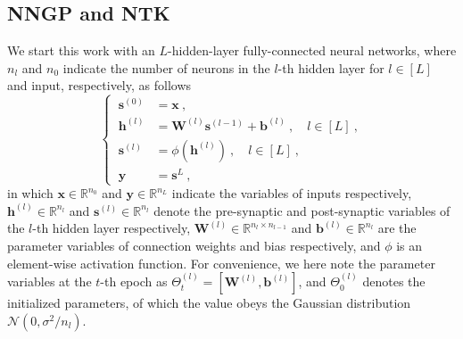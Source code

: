 \documentclass[review,10pt]{JMtemplate}
\begin{document}
\subsection{NNGP and NTK}  \label{subsec:two_kernels}
We start this work with an $L$-hidden-layer fully-connected neural networks, where $n_l$ and $n_0$ indicate the number of neurons in the $l$-th hidden layer for $l \in [L]$ and input, respectively, as follows
\begin{equation} \label{eq:feedforward}
	\left\{~\begin{aligned}
		\boldsymbol{s}^{(0)} &= \boldsymbol{x} \ , \\
		\boldsymbol{h}^{(l)} &= \mathbf{W}^{(l)} \boldsymbol{s}^{(l-1)} + \boldsymbol{b}^{(l)} \ ,\quad l \in [L] \ , \\
		\boldsymbol{s}^{(l)} &= \phi( \boldsymbol{h}^{(l)} ) \ ,\quad l \in [L] \ , \\
		\boldsymbol{y} &= \boldsymbol{s}^{L} \ ,
	\end{aligned}\right.
\end{equation}
in which $\boldsymbol{x} \in \mathbb{R}^{n_0}$ and $\boldsymbol{y} \in \mathbb{R}^{n_L}$ indicate the variables of inputs respectively, $\boldsymbol{h}^{(l)} \in \mathbb{R}^{n_l}$ and $\boldsymbol{s}^{(l)} \in \mathbb{R}^{n_l}$ denote the pre-synaptic and post-synaptic variables of the $l$-th hidden layer respectively,  $\mathbf{W}^{(l)} \in \mathbb{R}^{n_l \times n_{l-1}} $ and $\boldsymbol{b}^{(l)} \in \mathbb{R}^{n_l} $ are the parameter variables of connection weights and bias respectively, and $\phi$ is an element-wise activation function. For convenience, we here note the parameter variables at the $t$-th epoch as $\Theta^{(l)}_t = [ \mathbf{W}^{(l)}, \boldsymbol{b}^{(l)} ]$, and $\Theta^{(l)}_0$ denotes the initialized parameters, of which the value obeys the Gaussian distribution $\mathcal{N}(0, \sigma^2/n_l)$.
\end{document}
